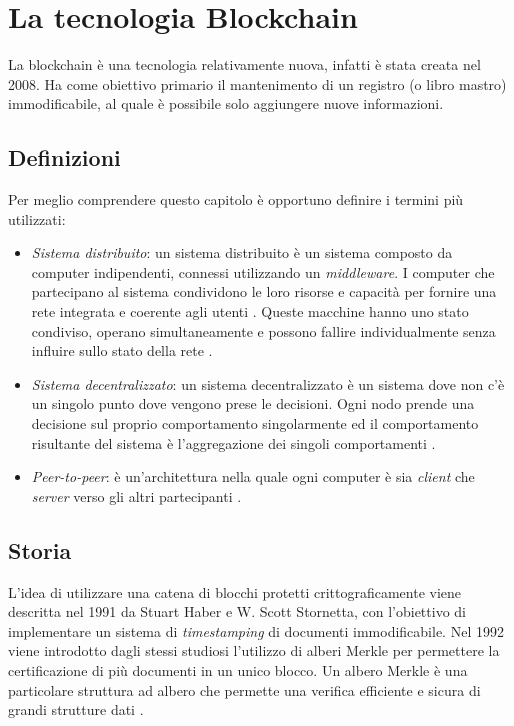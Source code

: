 \chapter{La tecnologia Blockchain}
\label{cha:tecnologia-blockchain}
La blockchain è una tecnologia relativamente nuova, infatti è stata creata nel 2008. Ha come obiettivo primario il mantenimento di un registro (o libro mastro) immodificabile, al quale è possibile solo aggiungere nuove informazioni.

\section{Definizioni}
\label{definizioni}
Per meglio comprendere questo capitolo è opportuno definire i termini più utilizzati:
\begin{itemize}
    \item \emph{Sistema distribuito}: un sistema distribuito è un sistema composto da computer indipendenti, connessi utilizzando un \emph{middleware}. I computer che partecipano al sistema condividono le loro risorse e capacità per fornire una rete integrata e coerente agli utenti \cite{distribuito}. Queste macchine hanno uno stato condiviso, operano simultaneamente e possono fallire individualmente senza influire sullo stato della rete \cite{distribuito-medium}.
    \item \emph{Sistema decentralizzato}: un sistema decentralizzato è un sistema dove non c'è un singolo punto dove vengono prese le decisioni. Ogni nodo prende una decisione sul proprio comportamento singolarmente ed il comportamento risultante del sistema è l'aggregazione dei singoli comportamenti \cite{decentralizzato}.
    \item \emph{Peer-to-peer}: è un'architettura nella quale ogni computer è sia \emph{client} che \emph{server} verso gli altri partecipanti \cite{p2p}.
\end{itemize}

\section{Storia}
L'idea di utilizzare una catena di blocchi protetti crittograficamente viene descritta nel 1991 da Stuart Haber e W. Scott Stornetta, con l'obiettivo di implementare un sistema di \emph{timestamping} di documenti immodificabile. Nel 1992 viene introdotto dagli stessi studiosi l'utilizzo di alberi Merkle per permettere la certificazione di più documenti in un unico blocco. Un albero Merkle è una particolare struttura ad albero che permette una verifica efficiente e sicura di grandi strutture dati \cite{merkle-tree}.


